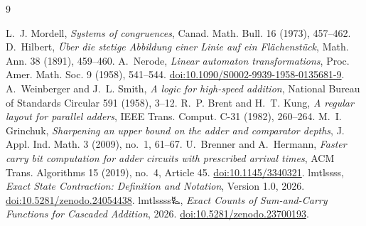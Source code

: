 \documentclass[11pt,a4paper]{article}
\theoremstyle{definition}
\begin{document}
\begin{thebibliography}{9}\raggedright
{}
L.~J. Mordell,
\emph{Systems of congruences},
Canad. Math. Bull. 16 (1973), 457--462.
D.~Hilbert,
\emph{Über die stetige Abbildung einer Linie auf ein Flächenstück},
Math. Ann. 38 (1891), 459--460.
A.~Nerode,
\emph{Linear automaton transformations},
Proc. Amer. Math. Soc. 9 (1958), 541--544.
\href{https://doi.org/10.1090/S0002-9939-1958-0135681-9}{doi:10.1090/S0002-9939-1958-0135681-9}.
A.~Weinberger and J.~L. Smith,
\emph{A logic for high-speed addition},
National Bureau of Standards Circular 591 (1958), 3--12.
R.~P. Brent and H.~T. Kung,
\emph{A regular layout for parallel adders},
IEEE Trans. Comput. C-31 (1982), 260--264.
M.~I. Grinchuk,
\emph{Sharpening an upper bound on the adder and comparator depths},
J. Appl. Ind. Math. 3 (2009), no.~1, 61--67.
U.~Brenner and A.~Hermann,
\emph{Faster carry bit computation for adder circuits with prescribed arrival times},
ACM Trans. Algorithms 15 (2019), no.~4, Article 45.
\href{https://doi.org/10.1145/3340321}{doi:10.1145/3340321}.
lmtlssss, \emph{Exact State Contraction: Definition and Notation}, Version 1.0, 2026.
\href{https://doi.org/10.5281/zenodo.24054438}{doi:10.5281/zenodo.24054438}.
lmtlssss{\authorsymbol 🜐}, \emph{Exact Counts of Sum-and-Carry Functions for Cascaded Addition}, 2026.
\href{https://doi.org/10.5281/zenodo.23700193}{doi:10.5281/zenodo.23700193}.
\end{thebibliography}
\end{document}
